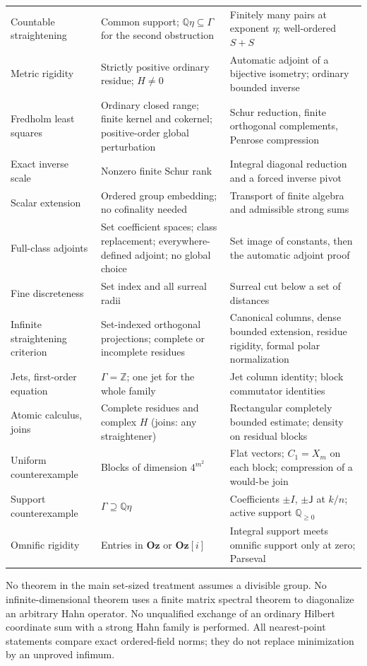 \documentclass[11pt,letterpaper]{article}
\numberwithin{equation}{section}
\theoremstyle{definition}
\theoremstyle{remark}
\newcommand{\Q}{\mathbb Q}
\newcommand{\Z}{\mathbb Z}
\newcommand{\Oz}{\mathbf{Oz}}
\begin{document}
{\begin{longtable}{@{}>{\raggedright\arraybackslash}p{}>{\raggedright\arraybackslash}p{}>{\raggedright\arraybackslash}p{}@{}}
Countable straightening & Common support; $\Q\eta\subseteq\Gamma$ for the
second obstruction & Finitely many pairs at exponent $\eta$; well-ordered
$S+S$\\[.4em]
Metric rigidity & Strictly positive ordinary residue; $H\ne0$ &
Automatic adjoint of a bijective isometry; ordinary bounded inverse\\[.4em]
Fredholm least squares & Ordinary closed range; finite kernel and cokernel;
positive-order global perturbation & Schur reduction, finite orthogonal
complements, Penrose compression\\[.4em]
Exact inverse scale & Nonzero finite Schur rank
 & Integral diagonal reduction and a forced inverse pivot\\[.4em]
Scalar extension & Ordered group embedding; no cofinality needed
 & Transport of finite algebra and admissible strong sums\\[.4em]
Full-class adjoints & Set coefficient spaces; class replacement;
everywhere-defined adjoint; no global choice
 & Set image of constants, then the automatic adjoint proof\\[.4em]
Fine discreteness & Set index and all surreal radii
 & Surreal cut below a set of distances\\[.4em]
Infinite straightening criterion & Set-indexed orthogonal projections;
complete or incomplete residues & Canonical columns, dense bounded extension,
residue rigidity, formal polar normalization\\[.4em]
Jets, first-order equation & $\Gamma=\Z$; one jet for the whole family
 & Jet column identity; block commutator identities\\[.4em]
Atomic calculus, joins & Complete residues and complex $H$ (joins: any
straightener) & Rectangular completely bounded estimate; density on residual
blocks\\[.4em]
Uniform counterexample & Blocks of dimension $4^{m^2}$ & Flat vectors;
$C_1=X_m$ on each block; compression of a would-be join\\[.4em]
Support counterexample & $\Gamma\supseteq\Q\eta$ & Coefficients $\pm I$,
$\pm\mathsf J$ at $k/n$; active support $\Q_{\ge0}$\\[.4em]
Omnific rigidity & Entries in $\Oz$ or $\Oz[i]$ & Integral support meets
omnific support only at zero; Parseval\\
\bottomrule
\end{longtable}}

No theorem in the main set-sized treatment assumes a divisible group.
No infinite-dimensional theorem uses a finite matrix spectral theorem
to diagonalize an arbitrary Hahn operator. No unqualified exchange
of an ordinary Hilbert coordinate sum with a strong Hahn family is
performed. All nearest-point statements compare exact ordered-field
norms; they do not replace minimization by an unproved infimum.
\end{document}
